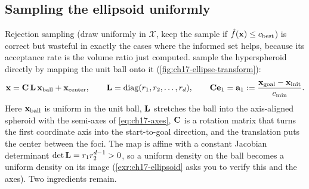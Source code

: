 \subsection{Sampling the ellipsoid uniformly}
\label{sec:ch17-sampling}

Rejection sampling (draw uniformly in $\mathcal{X}$, keep the sample if
$\hat f(\mathbf{x})\le c_{\mathrm{best}}$) is correct but wasteful in exactly the
cases where the informed set helps, because its acceptance rate is the
volume ratio just computed. \textcite{gammell2014informed} sample the
hyperspheroid directly by mapping the unit ball onto it
(\cref{fig:ch17-ellipse-transform}):
\begin{equation}
  \mathbf{x}=\mathbf{C}\,\mathbf{L}\,\mathbf{x}_{\mathrm{ball}}+\mathbf{x}_{\mathrm{center}},\qquad
  \mathbf{L}=\operatorname{diag}(r_1,r_2,\dots,r_d),\qquad
  \mathbf{C}\mathbf{e}_1=\mathbf{a}_1:=\frac{\mathbf{x}_{\mathrm{goal}}-\mathbf{x}_{\mathrm{init}}}{c_{\min}}.
  \label{eq:ch17-transform}
\end{equation}
Here $\mathbf{x}_{\mathrm{ball}}$ is uniform in the unit ball, $\mathbf{L}$
stretches the ball into the axis-aligned spheroid with the semi-axes of
\cref{eq:ch17-axes}, $\mathbf{C}$ is a rotation matrix that turns the first
coordinate axis into the start-to-goal direction, and the translation puts
the center between the foci. The map is affine with a constant Jacobian
determinant $\det\mathbf{L}=r_1r_2^{d-1}>0$, so a uniform density on the ball
becomes a uniform density on its image (\cref{exr:ch17-ellipsoid} asks you
to verify this and the axes). Two ingredients remain.
